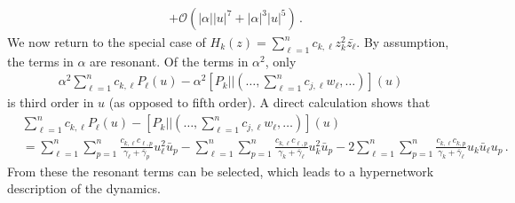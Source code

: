\documentclass[12pt]{article}
\renewcommand{\mathcal}{\mathscr}
\theoremstyle{plain}
\theoremstyle{definition}
\theoremstyle{remark}
\theoremstyle{remark}
\begin{document}
{\begin{align}
&+ \mathcal{O}(|\alpha||u|^7 + |\alpha|^3|u|^5) \, .
\end{align}
We now return to the special case of  $H_k(z) =  \sum_{\ell =1}^n c_{k,\ell}z_k^2\bar{z_{\ell}}$. By assumption, the terms in $\alpha$ are resonant. Of the terms in $\alpha^2$, only 
\begin{align}\label{lastofabstra2}
\alpha^2\sum_{\ell =1}^n c_{k,\ell}P_{\ell}(u) - \alpha^2[P_k|| (\dots, \sum_{\ell =1}^n c_{j,\ell}w_{\ell}, \dots )](u)
\end{align}
is third order in $u$ (as opposed to fifth order). A direct calculation shows that
\begin{align}\label{lastofabstra3}
&\sum_{\ell =1}^n c_{k,\ell}P_{\ell}(u) - [P_k|| (\dots, \sum_{\ell =1}^n c_{j,\ell}w_{\ell}, \dots )](u) \\ \nonumber
&= \sum_{\ell =1}^n \sum_{p =1}^n \frac{c_{k,\ell} c_{\ell,p}}{\gamma_{\ell} + \bar{\gamma}_p}u_{\ell}^2\bar{u}_{p} - \sum_{\ell =1}^n \sum_{p =1}^n \frac{c_{k,\ell} c_{\ell,p}}{\gamma_{k} + \bar{\gamma}_{\ell}}u_{k}^2\bar{u}_{p} - 2\sum_{\ell =1}^n \sum_{p =1}^n \frac{c_{k,\ell} c_{k,p}}{\gamma_{k} + \bar{\gamma}_{\ell}}u_{k}\bar{u}_{\ell}u_{p}  \, .
\end{align}
From these the resonant terms can be selected, which leads to a hypernetwork description of the dynamics. 



}


%
%
\end{document}
